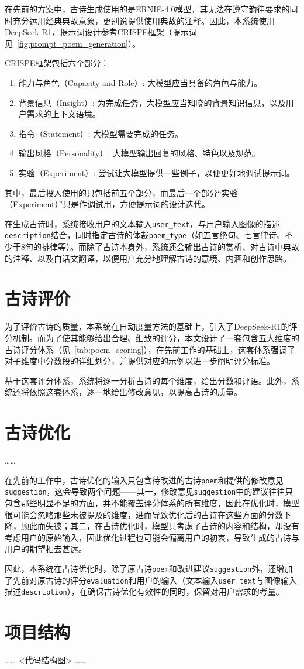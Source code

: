 在先前的方案中，古诗生成使用的是ERNIE-4.0模型，其无法在遵守韵律要求的同时充分运用经典典故意象，更别说提供使用典故的注释。因此，本系统使用DeepSeek-R1\cite{deepseek-aiDeepSeekR1IncentivizingReasoning2025}，提示词设计参考CRISPE框架（提示词见~\ref{fig:prompt_poem_generation}）。

CRISPE框架包括六个部分：
\begin{enumerate}
  \item 能力与角色（Capacity and Role）: 大模型应当具备的角色与能力。
  \item 背景信息（Insight）: 为完成任务，大模型应当知晓的背景知识信息，以及用户需求的上下文语境。
  \item 指令（Statement）: 大模型需要完成的任务。
  \item 输出风格（Personality）: 大模型输出回复的风格、特色以及规范。
  \item 实验（Experiment）: 尝试让大模型提供一些例子，以便更好地调试提示词。
\end{enumerate}

其中，最后投入使用的只包括前五个部分，而最后一个部分“实验（Experiment）”只是作调试用，方便提示词的设计迭代。

在生成古诗时，系统接收用户的文本输入\verb|user_text|，与用户输入图像的描述\verb|description|结合，同时指定古诗的体裁\verb|poem_type|（如五言绝句、七言律诗、不少于8句的排律等）。而除了古诗本身外，系统还会输出古诗的赏析、对古诗中典故的注释、以及白话文翻译，以便用户充分地理解古诗的意境、内涵和创作思路。


\section{古诗评价}

为了评价古诗的质量，本系统在自动度量方法的基础上，引入了DeepSeek-R1的评分机制。而为了使其能够给出合理、细致的评分，本文设计了一套包含五大维度的古诗评分体系（见~\ref{tab:poem_scoring}），在先前工作的基础上，这套体系强调了对子维度中分数段的详细划分，并提供对应的示例以进一步阐明评分标准。

基于这套评分体系，系统将逐一分析古诗的每个维度，给出分数和评语。此外，系统还将依照这套体系，逐一地给出修改意见，以提高古诗的质量。

\section{古诗优化}

……

在先前的工作中，古诗优化的输入只包含待改进的古诗\verb|poem|和提供的修改意见\verb|suggestion|，这会导致两个问题——其一，修改意见\verb|suggestion|中的建议往往只包含那些明显不足的方面，并不能覆盖评分体系的所有维度，因此在优化时，模型很可能会忽略那些未被提及的维度，进而导致优化后的古诗在这些方面的分数下降，顾此而失彼；其二，在古诗优化时，模型只考虑了古诗的内容和结构，却没有考虑用户的原始输入，因此优化过程也可能会偏离用户的初衷，导致生成的古诗与用户的期望相去甚远。

因此，本系统在古诗优化时，除了原古诗\verb|poem|和改进建议\verb|suggestion|外，还增加了先前对原古诗的评分\verb|evaluation|和用户的输入（文本输入\verb|user_text|与图像输入描述\verb|description|），在确保古诗优化有效性的同时，保留对用户需求的考量。

\section{项目结构}

……
<代码结构图>
……
